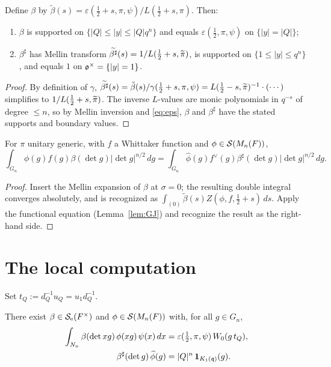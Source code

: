 \documentclass[11pt]{article}
\begin{document}
\begin{qtwolemma}\label{lem:beta}
Define $\beta$ by $\tilde\beta(s)=\varepsilon(\tfrac12+s,\pi,\psi)/L(\tfrac12+s,\pi)$.
Then:
\begin{enumerate}\setlength\itemsep{2pt}
\item $\beta$ is supported on $\{|Q|\le|y|\le|Q|q^n\}$ and equals
$\varepsilon(\tfrac12,\pi,\psi)$ on $\{|y|=|Q|\}$;
\item $\beta^\sharp$ has Mellin transform $\widetilde{\beta^\sharp}(s)=1/L(\tfrac12+s,\widetilde{\pi})$,
is supported on $\{1\le|y|\le q^n\}$, and equals $1$ on $\mathfrak{o}^\times=\{|y|=1\}$.
\end{enumerate}
\end{qtwolemma}

\begin{proof}
By definition of $\gamma$, $\widetilde{\beta^\sharp}(s)=\tilde\beta(s)/\gamma(\tfrac12+s,\pi,\psi)
=L(\tfrac12-s,\widetilde{\pi})^{-1}\cdot(\cdots)$ simplifies to $1/L(\tfrac12+s,\widetilde{\pi})$.
The inverse $L$-values are monic polynomials in $q^{-s}$ of degree $\le n$, so by
Mellin inversion and \eqref{eq:eps}, $\beta$ and $\beta^\sharp$ have the stated
supports and boundary values.
\end{proof}

\begin{qtwolemma}\label{lem:transfer}
For $\pi$ unitary generic, with $f$ a Whittaker function and
$\phi\in\mathcal{S}(M_n(F))$,
\[
\int_{G_n}\phi(g)f(g)\beta(\det g)|\det g|^{n/2}\,dg
=\int_{G_n}\widehat\phi(g)f^\vee(g)\beta^\sharp(\det g)|\det g|^{n/2}\,dg.
\]
\end{qtwolemma}

\begin{proof}
Insert the Mellin expansion of $\beta$ at $\sigma=0$; the resulting double
integral converges absolutely, and is recognized as
$\int_{(0)}\tilde\beta(s)Z(\phi,f,\tfrac12+s)\,ds$. Apply the functional equation
(Lemma~\ref{lem:GJ}) and recognize the result as the right-hand side.
\end{proof}

\section*{The local computation}

Set $t_Q:=d_Q^{-1}u_Q=u_1 d_Q^{-1}$.

\begin{qtwolemma}\label{lem:relations}
There exist $\beta\in\mathcal{S}_{\mathrm e}(F^\times)$ and $\phi\in\mathcal{S}(M_n(F))$ with, for all
$g\in G_n$,
\begin{align}
\int_{N_n}\beta(\det xg)\,\phi(xg)\,\psi(x)\,dx
&=\varepsilon(\tfrac12,\pi,\psi)\,W_0(g\,t_Q),\label{eq:rel1}\\
\beta^\sharp(\det g)\,\widehat\phi(g)&=|Q|^n\,\mathbf 1_{K_1(\mathfrak{q})}(g).\label{eq:rel2}
\end{align}
\end{qtwolemma}
\end{document}
